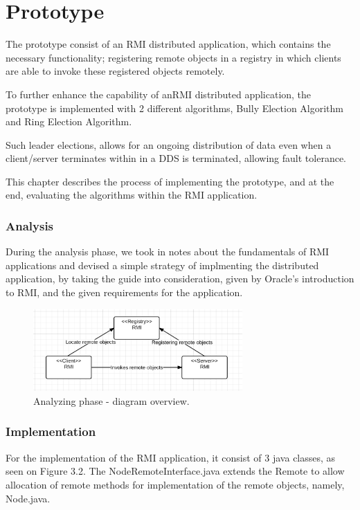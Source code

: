 \chapter{Prototype}
The prototype consist of an RMI distributed application, which contains the necessary functionality; registering remote objects in a registry in which clients are able to invoke these registered objects remotely.

To further enhance the capability of anRMI distributed application, the prototype is implemented with 2 different algorithms, Bully Election Algorithm and Ring Election Algorithm.

Such leader elections, allows for an ongoing distribution of data even when a client/server terminates within in a DDS is terminated, allowing fault tolerance.

This chapter describes the process of implementing the prototype, and at the end, evaluating the algorithms within the RMI application.

\subsection{Analysis}
During the analysis phase, we took in notes about the fundamentals of RMI applications and devised a simple strategy of implmenting the distributed application, by taking the guide into consideration, given by Oracle's introduction to RMI, and the given requirements for the application.

\begin{figure}[ht!]
\centering
\includegraphics[width=80mm]{img/analyze_diagram.png}
\caption{Analyzing phase - diagram overview.}
\label{Analyzing phase}
\end{figure}

\subsection{Implementation}
For the implementation of the RMI application, it consist of 3 java classes, as seen on Figure 3.2. The NodeRemoteInterface.java extends the Remote to allow allocation of remote methods for implementation of the remote objects, namely, Node.java. 

